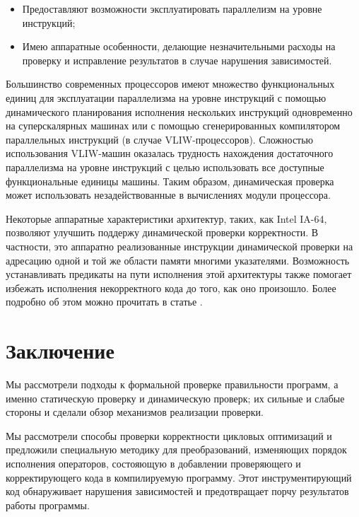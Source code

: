 \begin{itemize}
	\item Предоставляют возможности эксплуатировать параллелизм на уровне инструкций;
	\item Имею аппаратные особенности, делающие незначительными расходы на проверку и исправление результатов в случае нарушения зависимостей.
\end{itemize}

Большинство современных процессоров имеют множество функциональных единиц для эксплуатации параллелизма на уровне инструкций с помощью динамического планирования исполнения нескольких инструкций одновременно на суперскалярных машинах или с помощью сгенерированных компилятором параллельных инструкций (в случае VLIW-процессоров). Сложностью использования VLIW-машин оказалась трудность нахождения достаточного параллелизма на уровне инструкций с целью использовать все доступные функциональные единицы машины. Таким образом, динамическая проверка может использовать незадействованные в вычислениях модули процессора.

Некоторые аппаратные характеристики архитектур, таких, как Intel IA-64, позволяют улучшить поддержу динамической проверки корректности. В частности, это аппаратно реализованные инструкции динамической проверки на адресацию одной и той же области памяти многими указателями. Возможность устанавливать предикаты на пути исполнения этой архитектуры также помогает избежать исполнения некорректного кода до того, как оно произошло. Более подробно об этом можно прочитать в статье \cite{GHCP02}.

\section*{Заключение}
%

Мы рассмотрели подходы к формальной проверке правильности программ, а именно статическую проверку и динамическую проверк; их сильные и слабые стороны и сделали обзор механизмов реализации проверки.

Мы рассмотрели способы проверки корректности цикловых оптимизаций и предложили специальную методику для преобразований, изменяющих порядок исполнения операторов, состояющую в добавлении проверяющего и корректирующего кода в компилируемую программу. Этот инструментирующий код обнаруживает нарушения зависимостей и предотвращает порчу результатов работы программы.